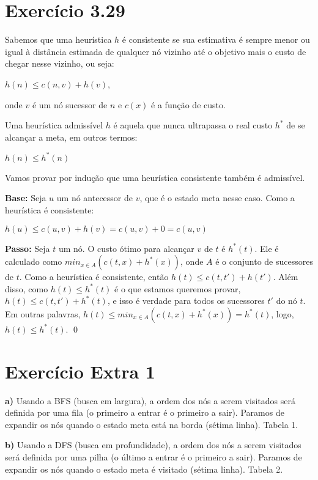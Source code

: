 \documentclass[12pt,letterpaper]{article}
\begin{document}
	\section*{Exercício 3.29}
	
	Sabemos que uma heurística $h$ é consistente se sua estimativa é sempre menor ou igual à distância estimada de qualquer nó vizinho até o objetivo mais o custo de chegar nesse vizinho, ou seja:
	\begin{center}
		$h(n) \leq c(n,v) + h(v)$,
	\end{center}  
	onde $v$ é um nó sucessor de $n$ e $c(x)$ é a função de custo.
	
	Uma heurística admissível $h$ é aquela que nunca ultrapassa o real custo $h^*$  de se alcançar a meta, em outros termos:
	\begin{center}
		$h(n) \leq h^*(n)$
	\end{center}
	
	Vamos provar por indução que uma heurística consistente também é admissível.
	
	\textbf{Base:} Seja $u$ um nó antecessor de $v$, que é o estado meta nesse caso. Como a heurística é consistente:
	\begin{center}
		$h(u)\leq c(u,v)+h(v)=c(u,v)+0=c(u,v)$
	\end{center}
	
	\textbf{Passo:} Seja $t$ um nó. O custo ótimo para alcançar $v$ de $t$ é $h^*(t)$.
	Ele é calculado como $min_{x\in A}(c(t, x)+h^*(x))$, onde $A$ é o conjunto de sucessores de $t$. Como a heurística é consistente, então $h(t)\leq c(t,t')+h(t')$. Além disso, como $h(t) \leq h^*(t)$ é o que estamos queremos provar, $h(t) \leq c(t, t') + h^*(t)$, e isso é verdade para todos os sucessores $t'$ do nó $t$. Em outras palavras, $h(t)\leq min_{x\in A}(c(t, x)+h^*(x))=h^*(t)$, logo, $h(t)\leq h^*(t)$. \qed
	
	\section*{Exercício Extra 1}
	\textbf{a)} Usando a BFS (busca em largura), a ordem dos nós a serem visitados será definida por uma fila (o primeiro a entrar é o primeiro a sair). Paramos de expandir os nós quando o estado meta está na borda (sétima linha). Tabela 1.
	
	\textbf{b)} Usando a DFS (busca em profundidade), a ordem dos nós a serem visitados será definida por uma pilha (o último a entrar é o primeiro a sair). Paramos de expandir os nós quando o estado meta é visitado (sétima linha). Tabela 2.
	
\end{document}
